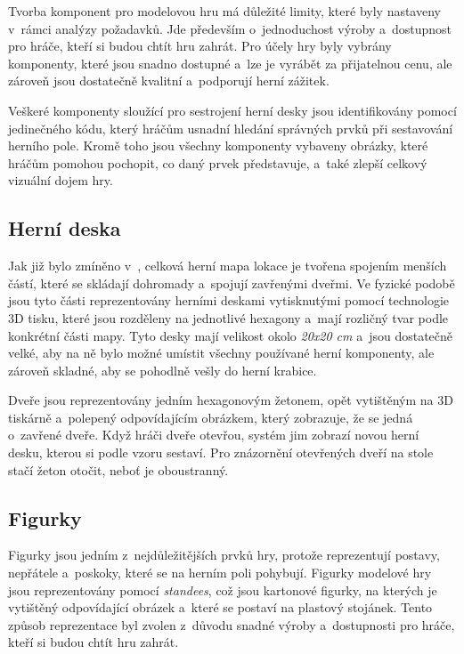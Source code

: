 Tvorba komponent pro modelovou hru má důležité limity, které byly nastaveny v~rámci analýzy požadavků. Jde především o~jednoduchost výroby a~dostupnost pro hráče, kteří si budou chtít hru zahrát. Pro účely hry byly vybrány komponenty, které jsou snadno dostupné a~lze je vyrábět za přijatelnou cenu, ale zároveň jsou dostatečně kvalitní a~podporují herní zážitek.

Veškeré komponenty sloužící pro sestrojení herní desky jsou identifikovány pomocí jedinečného kódu, který hráčům usnadní hledání správných prvků při sestavování herního pole. Kromě toho jsou všechny komponenty vybaveny obrázky, které hráčům pomohou pochopit, co daný prvek představuje, a~také zlepší celkový vizuální dojem hry.

\subsection{Herní deska}
\label{subsec:design_board}

Jak již bylo zmíněno v~, celková herní mapa lokace je tvořena spojením menších částí, které se skládají dohromady a~spojují zavřenými dveřmi. Ve fyzické podobě jsou tyto části reprezentovány herními deskami vytisknutými pomocí technologie 3D tisku, které jsou rozděleny na jednotlivé hexagony a~mají rozličný tvar podle konkrétní části mapy. Tyto desky mají velikost okolo \textit{20x20 cm} a~jsou dostatečně velké, aby na ně bylo možné umístit všechny používané herní komponenty, ale zároveň skladné, aby se pohodlně vešly do herní krabice.

Dveře jsou reprezentovány jedním hexagonovým žetonem, opět vytištěným na 3D tiskárně a~polepený odpovídajícím obrázkem, který zobrazuje, že se jedná o~zavřené dveře. Když hráči dveře otevřou, systém jim zobrazí novou herní desku, kterou si podle vzoru sestaví. Pro znázornění otevřených dveří na stole stačí žeton otočit, neboť je oboustranný.

\subsection{Figurky}
\label{subsec:design_figurines}

Figurky jsou jedním z~nejdůležitějších prvků hry, protože reprezentují postavy, nepřátele a~poskoky, které se na herním poli pohybují. Figurky modelové hry jsou reprezentovány pomocí \textit{standees}, což jsou kartonové figurky, na kterých je vytištěný odpovídající obrázek a~které se postaví na plastový stojánek. Tento způsob reprezentace byl zvolen z~důvodu snadné výroby a~dostupnosti pro hráče, kteří si budou chtít hru zahrát.

